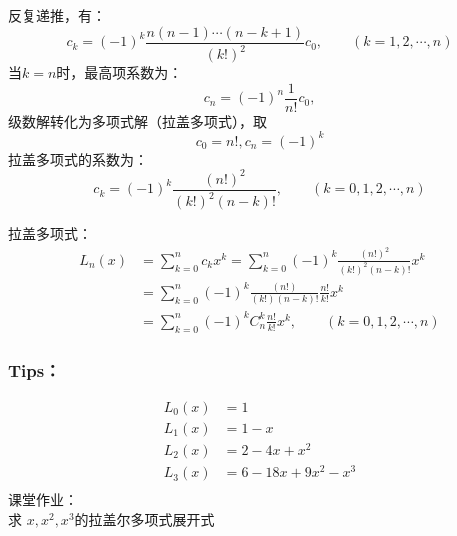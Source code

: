 \begin{frame}
	反复递推，有：
	\begin{equation*}
		c_{k}=(-1)^k \frac{n(n-1)\cdots (n-k+1)}{(k!)^2} c_0, \qquad (k=1,2,\cdots, n)
	\end{equation*}	
	当$k=n$时，最高项系数为：
	\begin{equation*}
		c_{n}=(-1)^n \frac{1}{n!} c_0, 
	\end{equation*}	
	级数解转化为多项式解（拉盖多项式），取
	\begin{equation*}
		c_{0}=n! ,   c_{n}=(-1)^k 
	\end{equation*}	
	拉盖多项式的系数为：
	\begin{equation*}
		c_{k}=(-1)^k \frac{(n!) ^2}{(k!)^2 (n-k)!},  \qquad (k=0,1,2,\cdots, n)
	\end{equation*}	
\end{frame}	

\begin{frame}
	拉盖多项式：
	\begin{equation*}
	\begin{split}
		L_n(x) &=\sum_{k=0}^{n} c_{k} x^k= \sum_{k=0}^{n} (-1)^k \frac{(n!)^2 }{(k!)^2 (n-k)!}x^k \\
		&= \sum_{k=0}^{n} (-1)^k \frac{(n!) }{(k!) (n-k)!} \frac{n!}{k!}x^k   \\
		&= \sum_{k=0}^{n} (-1)^k C^k _n \frac{n!}{k!}x^k,    \qquad (k=0,1,2,\cdots, n)
	\end{split}		
	\end{equation*}	
\end{frame}	

\begin{frame}
	\frametitle{Tips：}
	\begin{equation*}
	\begin{split}
		L_0(x)&=1\\
		L_1(x)&=1-x\\
		L_2(x)&=2-4x+x^2\\
		L_3(x)&=6-18x+9x^2-x^3\\
	\end{split}		
	\end{equation*}	
	课堂作业：\\
	求 $x, x^2, x^3 $的拉盖尔多项式展开式
\end{frame}	


